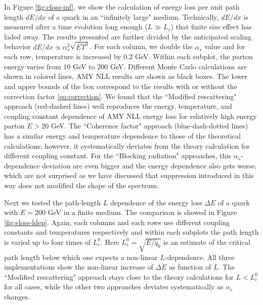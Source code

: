 \documentclass[aps, prc, reprint, amsmath, groupedaddress, nofootinbib]{revtex4-1}
\begin{document}
In Figure \ref{fig:eloss-inf}, we show the calculation of energy loss per unit path length $dE/dx$ of a quark in an ``infinitely large" medium. 
Technically, $dE/dx$ is measured after a time evolution long enough ($L\gg L_c$) that finite size effect has faded away.
The results presented are further divided by the anticipated scaling behavior $dE/dx \propto \alpha_s^2 \sqrt{ET^3}$.
For each column, we double the $\alpha_s$ value and for each row, temperature is increased by $0.2$ GeV. 
Within each subplot, the parton energy varies from $10$ GeV to $200$ GeV.
Different Monte Carlo calculations are shown in colored lines, AMY NLL results are shown as black boxes. The lower and upper bounds of the box correspond to the results with or without the correction factor \ref{eq:correction}.
We found that the ``Modified rescattering" approach (red-dashed lines) well reproduces the energy, temperature, and coupling constant dependence of AMY NLL energy loss for relatively high energy parton $E>20$ GeV.
The ``Coherence factor" approach (blue-dash-dotted lines) has a similar energy and temperature dependence to those of the theoretical calculations; however, it systematically deviates from the theory calculation for different coupling constant.
For the ``Blocking radiation" approaches, this $\alpha_s$-dependence deviation are even bigger and the energy dependence also gets worse, which are not surprised as we have discussed that suppression introduced in this way does not modified the shape of the spectrum.

Next we tested the path-length $L$ dependence of the energy loss $\Delta E$ of a quark with $E = 200$ GeV in a finite medium.
The comparison is showed in Figure \ref{fig:eloss-ldep}.
Again, each columns and each rows use different coupling constants and temperatures respectively and within each subplots the path length is varied up to four times of $L_c^0$.
Here $L_c^0 = \sqrt{E/\hat{q}_0}$ is an estimate of the critical path length below which one expects a non-linear $L$-dependence.
All three implementations show the non-linear increase of $\Delta E$ as function of $L$.
The ``Modified rescattering" approach stays close to the theory calculations for $L<L_c^0$ for all cases, while the other two approaches deviates systematically as $\alpha_s$ changes.
\end{document}
